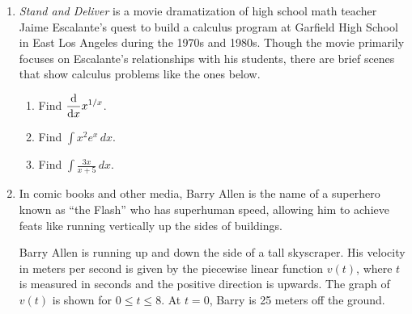 \documentclass{article}
\begin{document}
\begin{enumerate}
\begin{enumerate}
        \item 
        \begin{problem}
        $\displaystyle \lim_{x\to 0^+} \frac{e^{1/x}}{x^2} $
        \end{problem}
        \pspace{\vfill}
    \end{enumerate}

\pspace{\newpage}

\item 
\begin{problem}
    \emph{Stand and Deliver} is a movie dramatization of high school math teacher Jaime Escalante's quest to build a calculus program at Garfield High School in East Los Angeles during the 1970s and 1980s. Though the movie primarily focuses on Escalante's relationships with his students, there are brief scenes that show calculus problems like the ones below.
\end{problem}

\begin{enumerate}
    \item 
    \begin{problem}
        Find $\displaystyle \diff*{x^{1/x}}{x}$.
    \end{problem}
    \pspace{\vfill}

    \item
    \begin{problem}
        Find $\displaystyle \int x^2e^x\,dx$.
    \end{problem}
    \pspace{\vfill}

    \item
    \begin{problem}
        Find $\displaystyle \int \frac{3x}{x+5}\,dx$.
    \end{problem}
    \pspace{\vfill}
\end{enumerate}

\pspace{\newpage}

\item 
\begin{problem}
    In comic books and other media, Barry Allen is the name of a superhero known as ``the Flash'' who has superhuman speed, allowing him to achieve feats like running vertically up the sides of buildings.

    Barry Allen is running up and down the side of a tall skyscraper. His velocity in meters per second is given by the piecewise linear function $v(t)$, where $t$ is measured in seconds and the positive direction is upwards. The graph of $v(t)$ is shown for $0\leq t \leq 8$. At $t=0$, Barry is 25 meters off the ground.
    \vspace{-12pt}
    \begin{center}
\end{center}
\end{problem}
\end{enumerate}
\end{document}
